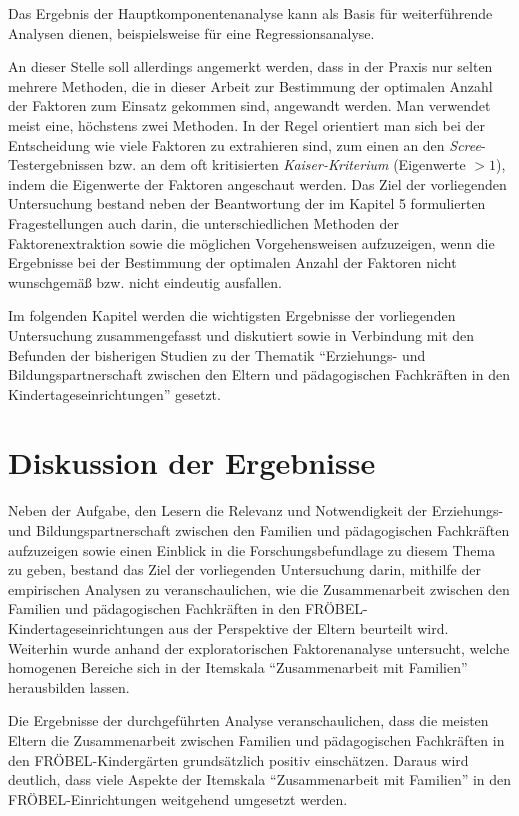 \documentclass[12pt,a4paper]{article}
\begin{document}
	Das Ergebnis der Hauptkomponentenanalyse kann als Basis für weiterführende Analysen dienen, beispielsweise für eine Regressionsanalyse.
	
An dieser Stelle soll allerdings angemerkt werden, dass in der Praxis nur selten mehrere Methoden, die in dieser Arbeit zur Bestimmung der optimalen Anzahl der Faktoren zum Einsatz gekommen sind, angewandt werden. Man verwendet meist eine, höchstens zwei Methoden. In der Regel orientiert man sich bei der Entscheidung wie viele Faktoren zu extrahieren sind, zum einen an den \textit{Scree}-Testergebnissen bzw. an dem oft kritisierten \textit{Kaiser-Kriterium} (Eigenwerte $>1$), indem die Eigenwerte der Faktoren angeschaut werden. Das Ziel der vorliegenden Untersuchung bestand neben der Beantwortung der im Kapitel 5 formulierten Fragestellungen auch darin, die unterschiedlichen Methoden der Faktorenextraktion sowie die möglichen Vorgehensweisen aufzuzeigen, wenn die Ergebnisse bei der Bestimmung der optimalen Anzahl der Faktoren nicht wunschgemäß bzw. nicht eindeutig ausfallen.

	Im folgenden Kapitel werden die wichtigsten Ergebnisse der vorliegenden Untersuchung zusammengefasst und diskutiert sowie in Verbindung mit den Befunden der bisherigen Studien zu der Thematik "`Erziehungs- und Bildungspartnerschaft zwischen den Eltern und pädagogischen Fachkräften in den Kindertageseinrichtungen"' gesetzt.

\section{Diskussion der Ergebnisse}
Neben der Aufgabe, den Lesern die Relevanz und Notwendigkeit der Erziehungs- und Bildungspartnerschaft zwischen den Familien und pädagogischen Fachkräften aufzuzeigen sowie einen Einblick in die Forschungsbefundlage zu diesem Thema zu geben, bestand das Ziel der vorliegenden Untersuchung darin, mithilfe der empirischen Analysen zu veranschaulichen, wie die Zusammenarbeit zwischen den Familien und pädagogischen Fachkräften in den FRÖBEL-Kinder\-tages\-ein\-rich\-tun\-gen aus der Perspektive der Eltern beurteilt wird.  Weiterhin wurde anhand der exploratorischen Faktorenanalyse untersucht, welche homogenen Bereiche sich in der Itemskala "`Zusammenarbeit mit Familien"' herausbilden  lassen.

	Die Ergebnisse der durchgeführten Analyse veranschaulichen, dass die meisten Eltern die Zusammenarbeit zwischen Familien und pädagogischen Fa\-chkräf\-ten in den FRÖBEL-Kindergärten grundsätzlich positiv einschätzen. Daraus wird deutlich, dass viele Aspekte der Itemskala "`Zusammenarbeit mit Familien"' in den FRÖBEL-Einrichtungen weitgehend umgesetzt werden.
	
\end{document}
